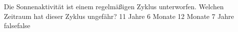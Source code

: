     {Die Sonnenaktivität ist einem regelmäßigen Zyklus unterworfen. Welchen Zeitraum hat dieser Zyklus ungefähr?}
    {11 Jahre}
    {6 Monate}
    {12 Monate}
    {7 Jahre}
    {false}{false}